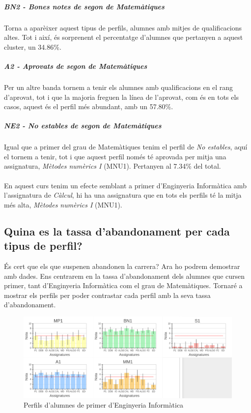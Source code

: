 \documentclass[12pt,a4paper,catalan]{article}
\begin{document}
\newpage

\subparagraph{BN2 - Bones notes de segon de Matemàtiques}
Torna a aparèixer aquest tipus de perfils, alumnes amb mitjes de qualificacions altes. Tot i així, és sorprenent el percentatge d'alumnes que pertanyen a aquest cluster, un 34.86\%.

\subparagraph{A2 - Aprovats de segon de Matemàtiques}
Per un altre banda tornem a tenir els alumnes amb qualificacions en el rang d'aprovat, tot i que la majoria freguen la línea de l'aprovat, com és en tots els casos, aquest és el perfil més abundant, amb un 57.80\%.

\subparagraph{NE2 - No estables de segon de Matemàtiques}
Igual que a primer del grau de Matemàtiques tenim el perfil de \textit{No estables}, aquí el tornem a tenir, tot i que aquest perfil només té aprovada per mitja una assignatura, \textit{Mètodes numèrics I} (MNU1). Pertanyen al 7.34\% del total.
\\
\\
En aquest curs tenim un efecte semblant a primer d'Enginyeria Informàtica amb l'assignatura de \textit{Càlcul}, hi ha una assignatura que en tots els perfils té la mitja més alta, \textit{Mètodes numèrics I} (MNU1).

\newpage

\subsection{Quina es la tassa d'abandonament per cada tipus de perfil?}
És cert que els que suspenen abandonen la carrera? Ara ho podrem demostrar amb dades. Ens centrarem en la tassa d'abandonament dels alumnes que cursen primer, tant d'Enginyeria Informàtica com el grau de Matemàtiques. Tornaré a mostrar els perfils per poder contrastar cada perfil amb la seva tassa d'abandonament.

\begin{figure}[h]
\centering
\includegraphics[width=\linewidth]{img/perfils_primer_info.png}
\caption{Perfils d'alumnes de primer d'Enginyeria Informàtica}
\end{figure}
\end{document}
